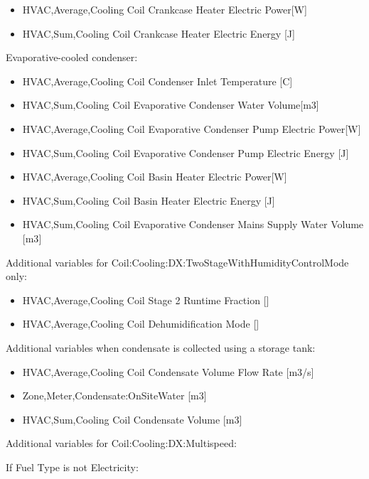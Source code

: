 \begin{itemize}
\item
  HVAC,Average,Cooling Coil Crankcase Heater Electric Power{[}W{]}
\item
  HVAC,Sum,Cooling Coil Crankcase Heater Electric Energy {[}J{]}
\end{itemize}

Evaporative-cooled condenser:

\begin{itemize}
\item
  HVAC,Average,Cooling Coil Condenser Inlet Temperature {[}C{]}
\item
  HVAC,Sum,Cooling Coil Evaporative Condenser Water Volume{[}m3{]}
\item
  HVAC,Average,Cooling Coil Evaporative Condenser Pump Electric Power{[}W{]}
\item
  HVAC,Sum,Cooling Coil Evaporative Condenser Pump Electric Energy {[}J{]}
\item
  HVAC,Average,Cooling Coil Basin Heater Electric Power{[}W{]}
\item
  HVAC,Sum,Cooling Coil Basin Heater Electric Energy {[}J{]}
\item
  HVAC,Sum,Cooling Coil Evaporative Condenser Mains Supply Water Volume {[}m3{]}
\end{itemize}

Additional variables for Coil:Cooling:DX:TwoStageWithHumidityControlMode only:

\begin{itemize}
\item
  HVAC,Average,Cooling Coil Stage 2 Runtime Fraction {[]}
\item
  HVAC,Average,Cooling Coil Dehumidification Mode {[]}
\end{itemize}

Additional variables when condensate is collected using a storage tank:

\begin{itemize}
\item
  HVAC,Average,Cooling Coil Condensate Volume Flow Rate {[}m3/s{]}
\item
  Zone,Meter,Condensate:OnSiteWater {[}m3{]}
\item
  HVAC,Sum,Cooling Coil Condensate Volume {[}m3{]}
\end{itemize}

Additional variables for Coil:Cooling:DX:Multispeed:

If Fuel Type is not Electricity:

